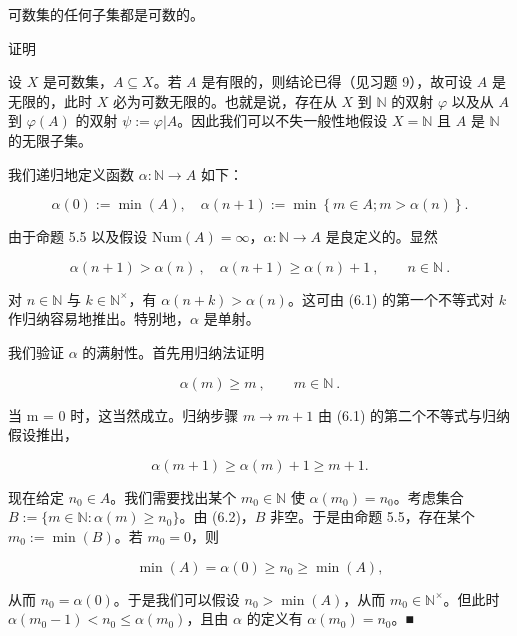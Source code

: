 \begin{proposition}

可数集的任何子集都是可数的。

证明

\begin{items}
\item

设 $X$ 是可数集，$A \subseteq X$。若 $A$ 是有限的，则结论已得（见习题 9），故可设 $A$ 是无限的，此时 $X$ 必为可数无限的。也就是说，存在从 $X$ 到 $\mathbb{N}$ 的双射 $\varphi$ 以及从 $A$ 到 $\varphi(A)$ 的双射 $\psi := \varphi|A$。因此我们可以不失一般性地假设 $X = \mathbb{N}$ 且 $A$ 是 $\mathbb{N}$ 的无限子集。

\item

我们递归地定义函数 $ \alpha: \mathbb{N} \to A $ 如下：

\[
\alpha(0):=\min(A),\quad\alpha(n+1):=\min\left\{m\in A;m>\alpha(n)\right\}.
\]

由于命题 5.5 以及假设 $ \text{Num}(A) = \infty $，$ \alpha: \mathbb{N} \to A $ 是良定义的。显然

\begin{equation}
\alpha(n+1)>\alpha(n)~,\quad\alpha(n+1)\geq\alpha(n)+1~,\qquad n\in\mathbb{N}~.
\end{equation}
\item

对 $ n \in \mathbb{N} $ 与 $ k \in \mathbb{N}^\times $，有 $ \alpha(n+k) > \alpha(n) $。这可由 (6.1) 的第一个不等式对 $ k $ 作归纳容易地推出。特别地，$ \alpha $ 是单射。

\item

我们验证 $ \alpha $ 的满射性。首先用归纳法证明

\begin{equation}
\alpha(m)\geq m~,\qquad m\in\mathbb{N}~.
\end{equation}

当 m = 0 时，这当然成立。归纳步骤 $ m \to m + 1 $ 由 (6.1) 的第二个不等式与归纳假设推出，

\[
\alpha(m+1)\geq\alpha(m)+1\geq m+1.
\]

现在给定 $ n_0 \in A $。我们需要找出某个 $ m_0 \in \mathbb{N} $ 使 $ \alpha(m_0) = n_0 $。考虑集合 $ B := \{m \in \mathbb{N} : \alpha(m) \geq n_0\} $。由 (6.2)，$ B $ 非空。于是由命题 5.5，存在某个 $ m_0 := \min(B) $。若 $ m_0 = 0 $，则

\[
\min(A)=\alpha(0)\geq n_{0}\geq\min(A),
\]

从而 $ n_0 = \alpha(0) $。于是我们可以假设 $ n_0 > \min(A) $，从而 $ m_0 \in \mathbb{N}^\times $。但此时 $ \alpha(m_0 - 1) < n_0 \leq \alpha(m_0) $，且由 $ \alpha $ 的定义有 $ \alpha(m_0) = n_0 $。■

\end{items}

\end{proposition}

